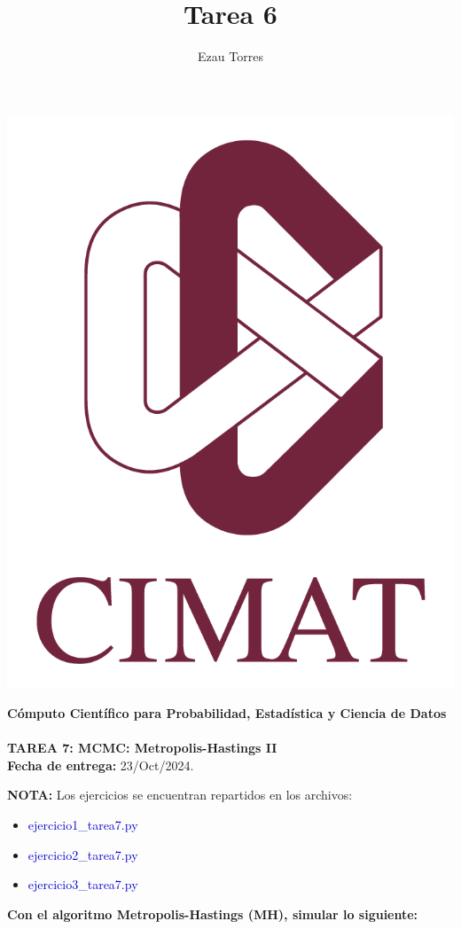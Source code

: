 \documentclass[a4paper,12pt]{report}
\title{Tarea 6}
\author{Ezau Torres}
\begin{document}
	\begin{minipage}{0.15\textwidth}
		\centering
		\includegraphics[width=\textwidth]{IMAGENES/logo}
	\end{minipage}
	\begin{minipage}{0.85\textwidth}
		\centering
		\textbf{\large Cómputo Científico para Probabilidad, Estadística y Ciencia de Datos}\\
		\medskip
		 \\
		\medskip
		\textbf{\large TAREA 7: MCMC: Metropolis-Hastings II}\\
		\medskip
		\textbf{Fecha de entrega:} 23/Oct/2024.
	\end{minipage}

\vspace{5mm}


\textcolor{BrickRed}{\bf NOTA:}  Los ejercicios se encuentran repartidos en los archivos:
\begin{itemize}
	\item \textcolor{mediumblue}{ejercicio1\_tarea7.py}
	\item \textcolor{mediumblue}{ejercicio2\_tarea7.py}
	\item \textcolor{mediumblue}{ejercicio3\_tarea7.py}
\end{itemize}

\textbf{Con el algoritmo Metropolis-Hastings (MH), simular lo siguiente:}




\end{document}
